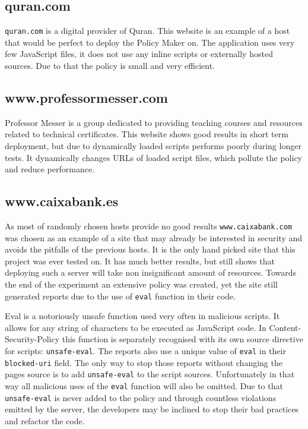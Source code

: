 \subsection{quran.com}

\texttt{quran.com} is a digital provider of Quran. 
This website is an example of a host that would be perfect to deploy the Policy Maker on.
The application uses very few JavaScript files, it does not use any inline scripts or externally hosted sources.
Due to that the policy is small and very efficient.

\subsection{www.professormesser.com}

Professor Messer is a group dedicated to providing teaching courses and resources related to technical certificates.
This website shows good results in short term deployment, but due to dynamically loaded scripts performs poorly during longer tests.
It dynamically changes URLs of loaded script files, which pollute the policy and reduce performance.

\subsection{www.caixabank.es}

As most of randomly chosen hosts provide no good results \texttt{www.caixabank.com} was chosen as an example of a site that may already be interested in security and avoids the pitfalls of the previous hosts.
It is the only hand picked site that this project was ever tested on. 
It has much better results, but still shows that deploying such a server will take non insignificant amount of resources.
Towards the end of the experiment an extensive policy was created, yet the site still generated reports due to the use of \texttt{eval} function in their code.

Eval is a notoriously unsafe function used very often in malicious scripts. 
It allows for any string of characters to be executed as JavaScript code. 
In Content-Security-Policy this function is separately recognised with its own source directive for scripts: \texttt{unsafe-eval}.
The reports also use a unique value of \texttt{eval} in their \texttt{blocked-uri} field.
The only way to stop those reports without changing the pages source is to add \texttt{unsafe-eval} to the script sources.
Unfortunately in that way all malicious uses of the \texttt{eval} function will also be omitted.
Due to that \texttt{unsafe-eval} is never added to the policy and through countless violations emitted by the server, the developers may be inclined to stop their bad practices and refactor the code.

